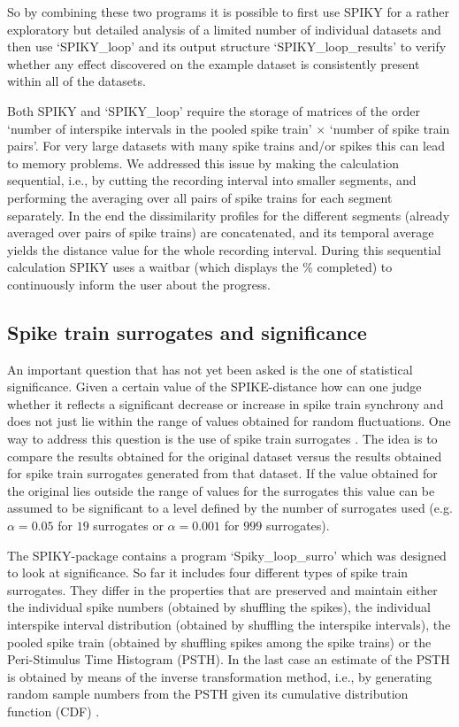 \documentclass[10pt,twocolumn]{elsart5p}
\begin{document}
So by combining these two programs it is possible to first use SPIKY for a rather exploratory but detailed analysis of a limited number of individual datasets and then use `SPIKY\_loop' and its output structure `SPIKY\_loop\_results' to verify whether any effect discovered on the example dataset is consistently present within all of the datasets.

Both SPIKY and `SPIKY\_loop' require the storage of matrices of the order `number of interspike intervals in the pooled spike train' $\times$ `number of spike train pairs'. For very large datasets with many spike trains and/or spikes this can lead to memory problems. We addressed this issue by making the calculation sequential, i.e., by cutting the recording interval into smaller segments, and performing the averaging over all pairs of spike trains for each segment separately. In the end the dissimilarity profiles for the different segments (already averaged over pairs of spike trains) are concatenated, and its temporal average yields the distance value for the whole recording interval. During this sequential calculation SPIKY uses a waitbar (which displays the \% completed) to continuously inform the user about the progress.


\subsection{\label{ss:Spike-train-surrogates} Spike train surrogates and significance}

An important question that has not yet been asked is the one of statistical significance. Given a certain value of the SPIKE-distance how can one judge whether it reflects a significant decrease or increase in spike train synchrony and does not just lie within the range of values obtained for random fluctuations. One way to address this question is the use of spike train surrogates \citep{Kass05, Gruen09, Louis10}. The idea is to compare the results obtained for the original dataset versus the results obtained for spike train surrogates generated from that dataset. If the value obtained for the original lies outside the range of values for the surrogates this value can be assumed to be significant to a level defined by the number of surrogates used (e.g. $\alpha = 0.05$ for $19$ surrogates or $\alpha = 0.001$ for $999$ surrogates).

The SPIKY-package contains a program `Spiky\_loop\_\-surro' which was designed to look at significance. So far it includes four different types of spike train surrogates. They differ in the properties that are preserved and maintain either the individual spike numbers (obtained by shuffling the spikes), the individual interspike interval distribution (obtained by shuffling the interspike intervals), the pooled spike train (obtained by shuffling spikes among the spike trains) or the Peri-Stimulus Time Histogram (PSTH). In the last case an estimate of the PSTH is obtained by means of the inverse transformation method, i.e., by generating random sample numbers from the PSTH given its cumulative distribution function (CDF) \citep{Ross97}.
\end{document}
